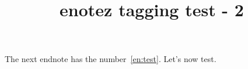\documentclass{article}
\title{enotez tagging test - 2}
\begin{document}
The next endnote\label{en:test} has
the number~\ref{en:test}. Let's now test\endnotemark[\ref{en:test}].

\printendnotes
\end{document}
